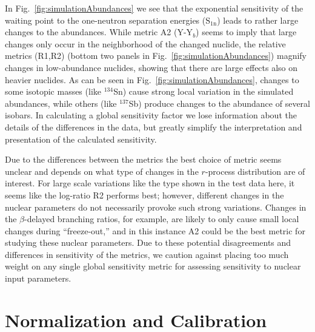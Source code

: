 \documentclass[aps,prc,reprint,showpacs,floatfix,nofootinbib]{revtex4-1}
\begin{document}
In Fig.~\ref{fig:simulationAbundances} we see that the exponential sensitivity of the waiting point to the one-neutron separation 
energies ($\textrm{S}_\textrm{1n}$) leads to rather large changes to the abundances. 
While metric A2 (Y-Y$_b$) seems to imply that large changes only occur in the neighborhood of the changed nuclide, the relative metrics (R1,R2) (bottom two panels in Fig.~\ref{fig:simulationAbundances}) 
magnify changes in low-abundance nuclides, showing that there are large effects also on heavier nuclides. 
As can be seen in Fig.~\ref{fig:simulationAbundances}, changes to some isotopic masses (like $^{134}$Sn) cause 
strong local variation in the simulated abundances, while others (like $^{137}$Sb) produce 
changes to the abundance of several isobars. 
In calculating a global sensitivity factor we lose information about the details of the differences in the data, 
but greatly simplify the interpretation and presentation of the calculated sensitivity. 

Due to the differences between the metrics the best choice of metric seems unclear and depends on what type of changes in the $r$-process 
distribution are of interest. For large scale variations like the type shown in the test data here, it seems like the log-ratio R2 performs best; however, 
different changes in the nuclear parameters do not necessarily 
provoke such strong variations. Changes in the $\beta$-delayed branching ratios, for example, are likely to only cause small 
local changes during ``freeze-out,'' and in this instance A2 could be the best 
metric for studying these nuclear parameters. Due to these potential disagreements and differences in sensitivity of the 
metrics, we caution against placing too much weight on any single global sensitivity metric for assessing sensitivity to 
nuclear input parameters. 

\section{Normalization and Calibration}
\end{document}
